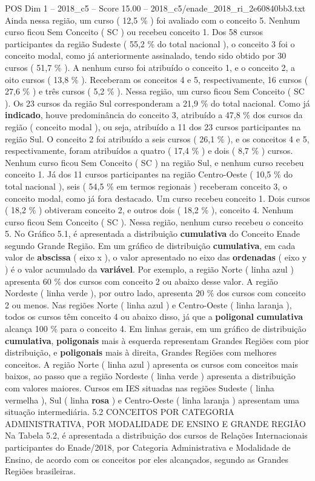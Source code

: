 \begin{textsample}{POS Dim 1 – 2018\_c5 – Score 15.00 – 2018\_c5/enade\_2018\_ri\_2e60840bb3.txt}
Ainda nessa região, um curso ( 12,5 \% ) foi avaliado com o conceito 5.
Nenhum curso ficou Sem Conceito ( SC ) ou recebeu conceito 1.
Dos 58 cursos participantes da região Sudeste ( 55,2 \% do total nacional ), o conceito 3 foi o conceito modal, como já anteriormente assinalado, tendo sido obtido por 30 cursos ( 51,7 \% ).
A nenhum curso foi atribuído o conceito 1, e o conceito 2, a oito cursos ( 13,8 \% ).
Receberam os conceitos 4 e 5, respectivamente, 16 cursos ( 27,6 \% ) e três cursos ( 5,2 \% ).
Nessa região, um curso ficou Sem Conceito ( SC ).
Os 23 cursos da região Sul corresponderam a 21,9 \% do total nacional.
Como já \textbf{indicado}, houve predominância do conceito 3, atribuído a 47,8 \% dos cursos da região ( conceito modal ), ou seja, atribuído a 11 dos 23 cursos participantes na região Sul.
O conceito 2 foi atribuído a seis cursos ( 26,1 \% ), e os conceitos 4 e 5, respectivamente, foram atribuídos a quatro ( 17,4 \% ) e dois ( 8,7 \% ) cursos.
Nenhum curso ficou Sem Conceito ( SC ) na região Sul, e nenhum curso recebeu conceito 1.
Já dos 11 cursos participantes na região Centro-Oeste ( 10,5 \% do total nacional ), seis ( 54,5 \% em termos regionais ) receberam conceito 3, o conceito modal, como já fora destacado.
Um curso recebeu conceito 1.
Dois cursos ( 18,2 \% ) obtiveram conceito 2, e outros dois ( 18,2 \% ), conceito 4.
Nenhum curso ficou Sem Conceito ( SC ).
Nessa região, nenhum curso recebeu o conceito 5.
No Gráfico 5.1, é apresentada a distribuição \textbf{cumulativa} do Conceito Enade segundo Grande Região.
Em um gráfico de distribuição \textbf{cumulativa}, em cada valor de \textbf{abscissa} ( eixo x ), o valor apresentado no eixo das \textbf{ordenadas} ( eixo y ) é o valor acumulado da \textbf{variável}.
Por exemplo, a região Norte ( linha azul ) apresenta 60 \% dos cursos com conceito 2 ou abaixo desse valor.
A região Nordeste ( linha verde ), por outro lado, apresenta 20 \% dos cursos com conceito 2 ou menos.
Nas regiões Norte ( linha azul ) e Centro-Oeste ( linha laranja ), todos os cursos têm conceito 4 ou abaixo disso, já que a \textbf{poligonal} \textbf{cumulativa} alcança 100 \% para o conceito 4.
Em linhas gerais, em um gráfico de distribuição \textbf{cumulativa}, \textbf{poligonais} mais à esquerda representam Grandes Regiões com pior distribuição, e \textbf{poligonais} mais à direita, Grandes Regiões com melhores conceitos.
A região Norte ( linha azul ) apresenta os cursos com conceitos mais baixos, ao passo que a região Nordeste ( linha verde ) apresenta a distribuição com valores maiores.
Cursos em IES situadas nas regiões Sudeste ( linha vermelha ), Sul ( linha \textbf{rosa} ) e Centro-Oeste ( linha laranja ) apresentam uma situação intermediária. 5.2 CONCEITOS POR CATEGORIA ADMINISTRATIVA, POR MODALIDADE DE ENSINO E GRANDE REGIÃO Na Tabela 5.2, é apresentada a distribuição dos cursos de Relações Internacionais participantes do Enade/2018, por Categoria Administrativa e Modalidade de Ensino, de acordo com os conceitos por eles alcançados, segundo as Grandes Regiões brasileiras.

\end{textsample}
